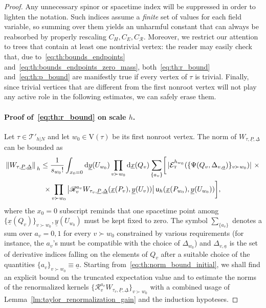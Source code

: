 \documentclass[a4paper, 11pt]{article}
\newcommand{\ren}{\mathcal{R}}								%
\newcommand{\kren}{\mathscr{R}}								%
\newcommand{\vrt}{\mathrm{V}}								%
\newcommand{\trees}{\mathcal{T}}							%
\newcommand{\TExp}[1]{\mathcal{E}^{#1}_%
{\scriptscriptstyle{\mathrm{T}}}}							%
\newcommand{\weight}{\mathsf{u}}							%
\theoremstyle{thm}
\begin{document}
\begin{proof}
Any unnecessary spinor or spacetime index will be suppressed in order to lighten the notation. Such indices assume a \emph{finite} set of values for each field variable, so summing over them yields an unharmful constant that can always be reabsorbed by properly rescaling $C_H, C_E, C_\ren$. Moreover, we restrict our attention to trees that contain at least one nontrivial vertex: the reader may easily check that, due to~\eqref{eq:th:bounds_endpoints} and~\eqref{eq:th:bounds_endpoints_zero_mass}, both~\eqref{eq:th:r_bound} and~\eqref{eq:th:p_bound} are manifestly true if every vertex of $\tau$ is trivial. Finally, since trivial vertices that are different from the first nonroot vertex will not play any active role in the following estimates, we can safely erase them.

\paragraph{Proof of~\eqref{eq:th:r_bound} on scale $h$.} Let $\tau \in \trees'_{h|N}$ and let $w_0 \in \vrt(\tau)$ be its first nonroot vertex. The norm of $W_{\tau, \underline{P}, \underline{\Delta}}$ can be bounded as 
\begin{multline}
\label{eq:th:norm_bound_initial}
\norm*{W_{\tau, \underline{P}, \underline{\Delta}}}_h \le \frac{1}{s_{w_0}!} \int_{x_0 = 0} \dd{\underline{y}(U_{w_0})} \prod_{v \succ w_0} \dd{\underline{x}(Q_v)} \sum_{\lbrace a_v \rbrace} \biggl[ \, \abs*{\TExp{h_{w_0}}( \lbrace \Psi(Q_v, \Delta_{v, \underline{a}}) \rbrace_{v \succ w_0} )} \, \times \\
\times \prod_{v \succ w_0} \abs{\kren_v^{a_v} W_{\tau_v, \underline{P}, \underline{\Delta}}(\underline{x}(P_v), \underline{y}(U_v))} \, \weight_h(\underline{x}(P_{w_0}), \underline{y}(U_{w_0})) \biggr],
\end{multline}
where the $x_0 = 0$ subscript reminds that one spacetime point among $\lbrace \underline{x}(Q_v) \rbrace_{v \succ w_0}, \underline{y}(U_{w_0})$ must be kept fixed to zero. The symbol $\sum_{\lbrace a_v \rbrace}$ denotes a sum over $a_v = 0, 1$ for every $v \succ w_0$ constrained by various requirements (for instance, the $a_v$'s must be compatible with the choice of $\Delta_{w_0}$) and $\Delta_{v, \underline{a}}$ is the set of derivative indices falling on the elements of $Q_v$ after a suitable choice of the quantities $\lbrace a_v \rbrace_{v \succ w_0} \equiv \underline{a}$. Starting from~\eqref{eq:th:norm_bound_initial}, we shall find an explicit bound on the truncated expectation value and to estimate the norms of the renormalized kernels $\lbrace \kren_v^{a_v} W_{\tau_v, \underline{P}, \underline{\Delta}} \rbrace_{v \succ w_0}$ with a combined usage of Lemma~\ref{lm:taylor_renormalization_gain} and the induction hypoteses. 


\end{proof}
\end{document}
